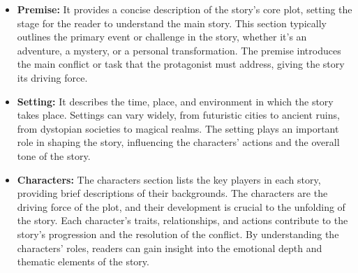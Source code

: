 \documentclass[letterpaper]{article} %
\begin{document}
\begin{itemize}
  \item \textbf{Premise:} It provides a concise description of the story's core plot, setting the stage for the reader to understand the main story. This section typically outlines the primary event or challenge in the story, whether it's an adventure, a mystery, or a personal transformation. The premise introduces the main conflict or task that the protagonist must address, giving the story its driving force.
  
  \item \textbf{Setting:} It describes the time, place, and environment in which the story takes place. Settings can vary widely, from futuristic cities to ancient ruins, from dystopian societies to magical realms. The setting plays an important role in shaping the story, influencing the characters' actions and the overall tone of the story.
  
  \item \textbf{Characters:} The characters section lists the key players in each story, providing brief descriptions of their backgrounds. The characters are the driving force of the plot, and their development is crucial to the unfolding of the story. Each character's traits, relationships, and actions contribute to the story's progression and the resolution of the conflict. By understanding the characters' roles, readers can gain insight into the emotional depth and thematic elements of the story.
\end{itemize}

\onecolumn
\end{document}
